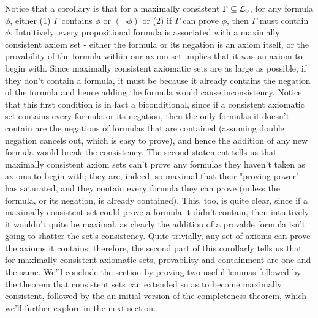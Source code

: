 \documentclass{article}
\begin{document}
Notice that a corollary is that for a maximally consistent $ \Gamma \subseteq \mathcal{L}_0 $, for any formula $ \phi $, either (1) $ \Gamma $ contains $ \phi $ or $ (\neg \phi) $ or (2) if $ \Gamma $ can prove $ \phi $, then $ \Gamma $ must contain $ \phi $. Intuitively, every propositional formula is associated with a maximally consistent axiom set - either the formula or its negation is an axiom itself, or the provability of the formula within our axiom set implies that it was an axiom to begin with. Since maximally consistent axiomatic sets are as large as possible, if they don't contain a formula, it must be because it already contains the negation of the formula and hence adding the formula would cause inconsistency. Notice that this first condition is in fact a biconditional, since if a consistent axiomatic set contains every formula or its negation, then the only formulas it doesn't contain are the negations of formulas that are contained (assuming double negation cancels out, which is easy to prove), and hence the addition of any new formula would break the consistency.
\nn
The second statement tells us that maximally consistent axiom sets can't prove any formulas they haven't taken as axioms to begin with; they are, indeed, so maximal that their "proving power" has saturated, and they contain every formula they can prove (unless the formula, or its negation, is already contained). This, too, is quite clear, since if a maximally consistent set could prove a formula it didn't contain, then intuitively it wouldn't quite be maximal, as clearly the addition of a provable formula isn't going to shatter the set's consistency. Quite trivially, any set of axioms can prove the axioms it contains; therefore, the second part of this corollarly tells us that for maximally consistent axiomatic sets, provability and containment are one and the same.
\nn
We'll conclude the section by proving two useful lemmas followed by the theorem that consistent sets can extended so as to become maximally consistent, followed by the an initial version of the completeness theorem, which we'll further explore in the next section.
\end{document}
